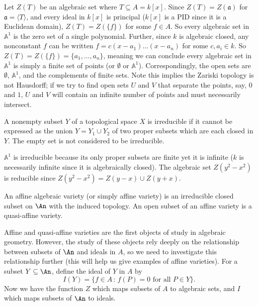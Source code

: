 \begin{example}
Let $Z(T)$ be an algebraic set where $T \subseteq A = k[x]$.
Since $Z(T) = Z(\mathfrak{a})$ for $\mathfrak{a} = \langle T \rangle$, and every ideal in $k[x]$ is principal ($k[x]$ is a PID since it is a Euclidean domain), $Z(T) = Z(\{f\})$ for some $f \in A$.
So every algebraic set in $\mathbb{A}^1$ is the zero set of a single polynomial.
Further, since $k$ is algebraic closed, any nonconstant $f$ can be written $f = c(x - a_1) \dots (x-a_n)$ for some $c, a_i \in k$.
So $Z(T) = Z(\{f\}) = \{a_1, \ldots, a_n\}$, meaning we can conclude every algebraic set in $\mathbb{A}^1$ is simply a finite set of points (or $\emptyset$ or $\mathbb{A}^1$).
Correspondingly, the open sets are $\emptyset$, $\mathbb{A}^1$, and the complements of finite sets.
Note this implies the Zariski topology is not Hausdorff;
if we try to find open sets $U$ and $V$ that separate the points, say, $0$ and $1$, $U$ and $V$ will contain an infinite number of points and must necessarily intersect.
\end{example}

\begin{definition}
A nonempty subset $Y$ of a topological space $X$ is irreducible if it cannot be expressed as the union $Y = Y_1 \cup Y_2$ of two proper subsets which are each closed in $Y$.
The empty set is not considered to be irreducible.
\end{definition}

\begin{example}
$\mathbb{A}^1$ is irreducible because its only proper subsets are finite yet it is infinite ($k$ is necessarily infinite since it is algebraically closed).
The algebraic set $Z(y^2 - x^2)$ is reducible since $Z(y^2 - x^2) = Z(y - x) \cup Z(y +x)$.
\end{example}

\begin{definition}
An affine algebraic variety (or simply affine variety) is an irreducible closed subset on $\An$ with the induced topology.
An open subset of an affine variety is a quasi-affine variety.
\end{definition}

Affine and quasi-affine varieties are the first objects of study in algebraic geometry.
However, the study of these objects rely deeply on the relationship between subsets of $\An$ and ideals in $A$, so we need to investigate this relationship further (this will help us give examples of affine varieties).
For a subset $Y \subseteq \An$, define the ideal of $Y$ in $A$ by
$$I(Y) = \{f \in A \, : \, f(P) = 0 \text{ for all } P \in Y\}.$$
Now we have the function $Z$ which maps subsets of $A$ to algebraic sets, and $I$ which maps subsets of $\An$ to ideals.

